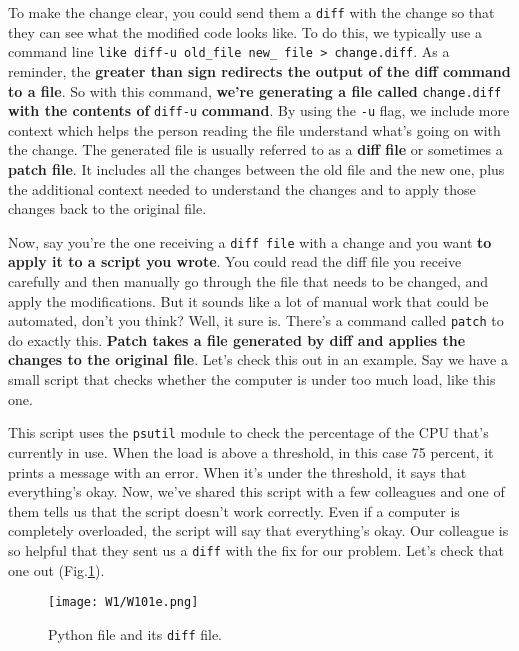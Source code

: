 	To make the change clear, you could send them a \texttt{diff} with the change so that they can see what the modified code looks like. To do this, we typically use a command line \verb|like diff-u old_file new_ file > change.diff|. As a reminder, the \textbf{greater than sign redirects the output of the diff command to a file}. So with this command, \textbf{we're generating a file called} \texttt{change.diff} \textbf{with the contents of} \texttt{diff-u} \textbf{command}. 
	By using the \texttt{-u} flag, we include more context which helps the person reading the file understand what's going on with the change. The generated file is usually referred to as a \textbf{diff file} or sometimes a \textbf{patch file}. 
	It includes all the changes between the old file and the new one, plus the additional context needed to understand the changes and to apply those changes back to the original file. 
	
	Now, say you're the one receiving a \texttt{diff file} with a change and you want \textbf{to apply it to a script you wrote}. You could read the diff file you receive carefully and then manually go through the file that needs to be changed, and apply the modifications. But it sounds like a lot of manual work that could be automated, don't you think? Well, it sure is. There's a command called \texttt{patch} to do exactly this. \textbf{Patch takes a file generated by diff and applies the changes to the original file}. Let's check this out in an example. Say we have a small script that checks whether the computer is under too much load, like this one.
	
	This script uses the \texttt{psutil} module to check the percentage of the CPU that's currently in use. When the load is above a threshold, in this case 75 percent, it prints a message with an error. When it's under the threshold, it says that everything's okay. 
	Now, we've shared this script with a few colleagues and one of them tells us that the script doesn't work correctly. Even if a computer is completely overloaded, the script will say that everything's okay. Our colleague is so helpful that they sent us a \texttt{diff} with the fix for our problem. Let's check that one out (Fig.\ref{W101e}). 
	
	\begin{figure} 
		\caption{Python file and its \texttt{diff} file.}
		\centering
		\texttt{[image: W1/W101e.png]}
		\label{W101e}
	\end{figure}
	
